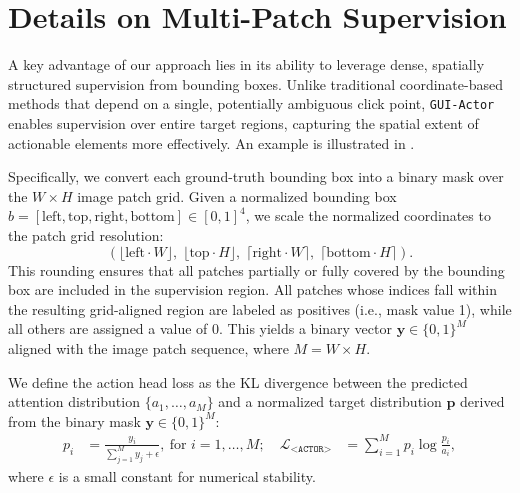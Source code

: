 \documentclass{article}
\newcommand{\sys}{\texttt{GUI-Actor}\xspace}
\begin{document}
\section{Details on Multi-Patch Supervision}
\label{appendix:multi_path_supervision}
A key advantage of our approach lies in its ability to leverage dense, spatially structured supervision from bounding boxes. Unlike traditional coordinate-based methods that depend on a single, potentially ambiguous click point, \sys enables supervision over entire target regions, capturing the spatial extent of actionable elements more effectively. An example is illustrated in .

Specifically, we convert each ground-truth bounding box into a binary mask over the $W \times H$ image patch grid.
Given a normalized bounding box $b = [\text{left}, \text{top}, \text{right}, \text{bottom}] \in [0,1]^4$, we scale the normalized coordinates to the patch grid resolution:
\begin{equation}
\left( \lfloor \text{left} \cdot W \rfloor,\; \lfloor \text{top} \cdot H \rfloor,\; \lceil \text{right} \cdot W \rceil,\; \lceil \text{bottom} \cdot H \rceil \right).
\end{equation}
This rounding ensures that all patches partially or fully covered by the bounding box are included in the supervision region.
All patches whose indices fall within the resulting grid-aligned region are labeled as positives (i.e., mask value 1), while all others are assigned a value of 0.
This yields a binary vector $\mathbf{y} \in \{0, 1\}^M$ aligned with the image patch sequence, where $M = W \times H$.

We define the action head loss as the KL divergence between the predicted attention distribution $\{a_1, \dots, a_M\}$ and a normalized target distribution $\mathbf{p}$ derived from the binary mask $\mathbf{y} \in \{0, 1\}^M$:
\begin{equation}
\begin{aligned}
\displaystyle p_i &= \frac{y_i}{\sum_{j=1}^M y_j + \epsilon}, \: \text{for } i = 1, \dots, M; \quad
\displaystyle \mathcal{L}_{\texttt{<ACTOR>}} &= \sum_{i=1}^M p_i \log \frac{p_i}{a_i},
\end{aligned}
\end{equation}
where $\epsilon$ is a small constant for numerical stability.
\end{document}
